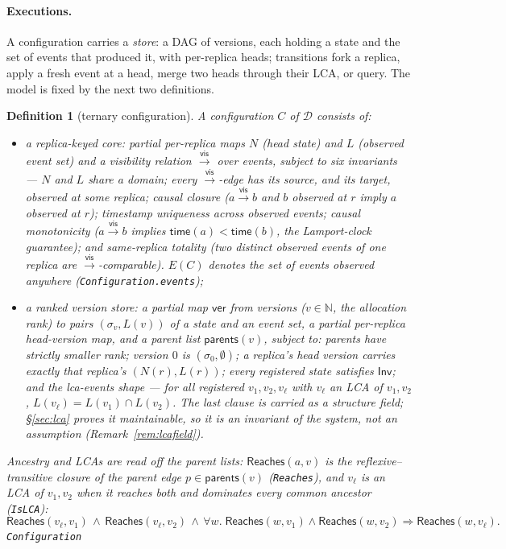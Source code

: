 \documentclass[11pt]{article}
\newtheorem{definition}[theorem]{Definition}
\newcommand{\vis}{\xrightarrow{\mathsf{vis}}}
\newcommand{\Sinit}{\sigma_0}
\newcommand{\lean}[1]{\texttt{#1}}
\newcommand{\M}[1]{\mathcal{#1}}
\newcommand{\Inv}{\mathsf{Inv}}
\begin{document}
\paragraph{Executions.} A configuration carries a \emph{store}: a DAG of
versions, each holding a state and the set of events that produced it,
with per-replica heads; transitions fork a replica, apply a fresh event
at a head, merge two heads through their LCA, or query. The model is
fixed by the next two definitions.

\begin{definition}[ternary configuration]
\label{def:config}
A configuration $C$ of $\M{D}$ consists of:
\begin{itemize}[leftmargin=2em]
\item a \emph{replica-keyed core}: partial per-replica maps $N$ (head
  state) and $L$ (observed event set) and a visibility relation $\vis$
  over events, subject to six invariants --- $N$ and $L$ share a
  domain; every $\vis$-edge has its source, and its target, observed at
  some replica; causal closure ($a \vis b$ and $b$ observed at $r$
  imply $a$ observed at $r$); timestamp uniqueness across observed
  events; causal monotonicity ($a \vis b$ implies
  $\mathsf{time}(a) < \mathsf{time}(b)$, the Lamport-clock guarantee);
  and same-replica totality (two distinct observed events of one
  replica are $\vis$-comparable). $E(C)$ denotes the set of events
  observed anywhere (\lean{Configuration.events});
\item a \emph{ranked version store}: a partial map $\mathsf{ver}$ from
  versions ($v \in \mathbb{N}$, the allocation rank) to pairs
  $(\sigma_v, L(v))$ of a state and an event set, a partial per-replica
  head-version map, and a parent list $\mathsf{parents}(v)$, subject
  to: parents have strictly smaller rank; version $0$ is
  $(\Sinit, \emptyset)$; a replica's head version carries exactly that
  replica's $(N(r), L(r))$; every registered state satisfies $\Inv$;
  and the \emph{lca-events shape} --- for all registered $v_1, v_2,
  v_\ell$ with $v_\ell$ an LCA of $v_1, v_2$,
  $L(v_\ell) = L(v_1) \cap L(v_2)$. The last clause is carried as a
  structure field; \S\ref{sec:lca} proves it maintainable, so it is an
  invariant of the system, not an assumption
  (Remark~\ref{rem:lcafield}).
\end{itemize}
Ancestry and LCAs are read off the parent lists:
$\mathsf{Reaches}(a, v)$ is the reflexive--transitive closure of the
parent edge $p \in \mathsf{parents}(v)$ (\lean{Reaches}), and $v_\ell$
is an \emph{LCA} of $v_1, v_2$ when it reaches both and dominates every
common ancestor (\lean{IsLCA}):
\[
  \mathsf{Reaches}(v_\ell, v_1) \,\wedge\, \mathsf{Reaches}(v_\ell, v_2)
  \,\wedge\, \forall w.\;
  \mathsf{Reaches}(w, v_1) \wedge \mathsf{Reaches}(w, v_2)
  \Rightarrow \mathsf{Reaches}(w, v_\ell).
\]
\hfill\lean{Configuration}
\end{definition}
\end{document}
